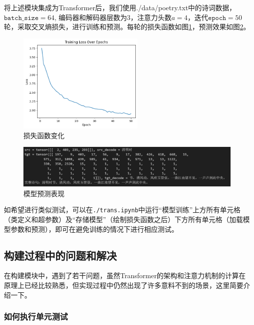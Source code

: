 将上述模块集成为Transformer后，我们使用./data/poetry.txt中的诗词数据，$\texttt{batch\_size} = 64$, 编码器和解码器层数为$3$，注意力头数$a=4$，迭代$\texttt{epoch} = 50$轮，采取交叉熵损失，进行训练和预测。每轮的损失函数如图\ref{fig:simpleT-loss}，预测效果如图\ref{fig:simpleT-performance}。
\begin{figure}[h]
    \centering
    \includegraphics[width = 0.55\textwidth]{img/simpleT/simpleT-loss.png}
    \caption{损失函数变化}
    \label{fig:simpleT-loss}
\end{figure}

\begin{figure}[h]
    \centering
    \includegraphics[width = \textwidth]{img/simpleT/simpleT-performance.png}
    \caption{模型预测表现}
    \label{fig:simpleT-performance}
\end{figure}

如希望进行类似测试，可以在\texttt{./trans.ipynb}中运行“模型训练”上方所有单元格（类定义和超参数）及“存储模型”（绘制损失函数之后）下方所有单元格（加载模型参数和预测），即可在避免训练的情况下进行相应测试。

\subsection{构建过程中的问题和解决}

在构建模块中，遇到了若干问题，虽然Transformer的架构和注意力机制的计算在原理上已经比较熟悉，但实现过程中仍然出现了许多意料不到的场景，这里简要介绍一下。

\subsubsection{如何执行单元测试}

